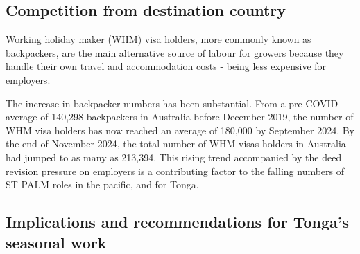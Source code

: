 \documentclass[9pt,a4paper,twocolumn,twoside]{tau-class/tau}
\begin{document}
 









\subsection{Competition from destination country}

Working holiday maker (WHM) visa holders, more commonly known as backpackers, are the main alternative source of labour for growers because they handle their own travel and accommodation costs - being less expensive for employers.






The increase in backpacker numbers has been substantial. From a pre-COVID average of 140,298 backpackers in Australia before December 2019, the number of WHM visa holders has now reached an average of 180,000 by September 2024. By the end of November 2024, the total number of WHM visas holders in Australia had jumped to as many as 213,394. This rising trend accompanied by the deed revision pressure on employers is a contributing factor to the falling numbers of ST PALM roles in the pacific, and for Tonga.    

\subsection*{Implications and recommendations for Tonga's seasonal work}

\end{document}
